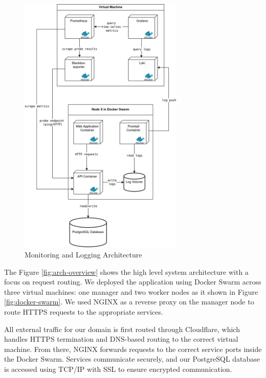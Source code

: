 \begin{figure}[H]
  \centering
  \includegraphics[width=0.7\textwidth]{images/monitoring-arch.png}
  \caption{Monitoring and Logging Architecture}
  \label{fig:monitoring-arch}
\end{figure}

The Figure \ref{fig:arch-overview} shows the high level system architecture with a focus on request routing. We deployed the application using Docker Swarm across three virtual machines: one manager and two worker nodes as it shown in Figure \ref{fig:docker-swarm}. We used NGINX as a reverse proxy on the manager node to route HTTPS requests to the appropriate services.

All external traffic for our domain is first routed through Cloudflare, which handles HTTPS termination and DNS-based routing to the correct virtual machine. From there, NGINX forwards requests to the correct service ports inside the Docker Swarm. Services communicate securely, and our PostgreSQL database is accessed using TCP/IP with SSL to ensure encrypted communication.

